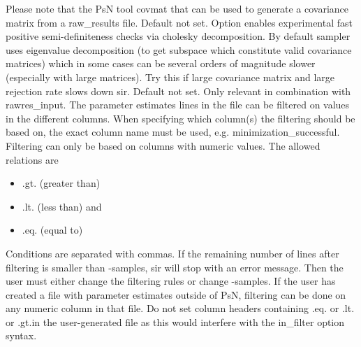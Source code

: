 \begin{optionlist}
Please note that the PsN tool covmat that can be used to generate a covariance matrix from a raw\_results file.
\nextopt
{}
Default not set. Option enables experimental fast positive semi-definiteness checks via cholesky decomposition. By default sampler uses eigenvalue decomposition (to get subspace which constitute valid covariance matrices) which in some cases can be several orders of magnitude slower (especially with large matrices). Try this if large covariance matrix and large rejection rate slows down sir.
\nextopt
{}
Default not set. Only relevant in combination with rawres\_input. The parameter estimates lines in the file can be filtered on values in the different columns. When specifying which column(s) the filtering should be based on, the exact column name must be used, e.g. minimization\_successful. Filtering can only be based on columns with numeric values. The allowed relations are 
\begin{itemize}
	\item .gt. (greater than)
	\item .lt. (less than)
	and
	\item .eq. (equal to)
\end{itemize} 
Conditions are separated with commas. If the remaining number of lines after filtering is smaller than -samples, sir will stop with an error message. Then the user must either change the filtering rules or change -samples. If the user has created a file with parameter estimates outside of PsN, filtering can be done on any numeric column in that file. Do not set column headers containing .eq. or .lt. or .gt.in the user-generated file as this would interfere with the in\_filter option syntax.


\end{optionlist}
